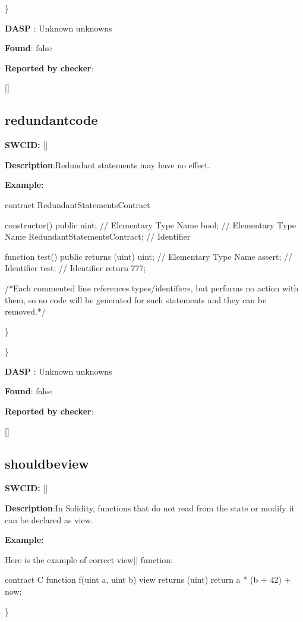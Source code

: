 \documentclass{article}
\begin{document}
\} 

\textbf{DASP} : Unknown unknowns

\textbf{Found}: false

\textbf{Reported by checker}: 
\begin{ffcode} 

[]
\end{ffcode} 
\subsection{redundant{\textunderscore}code} 
\textbf{SWC{\textunderscore}ID:} []

\textbf{Description}:Redundant statements may have no effect.


\textbf{Example:} 
\begin{ffcode} 

contract RedundantStatementsContract {

    constructor() public {
        uint; // Elementary Type Name
        bool; // Elementary Type Name
        RedundantStatementsContract; // Identifier
    }

    function test() public returns (uint) {
        uint; // Elementary Type Name
        assert; // Identifier
        test; // Identifier
        return 777;
    }
}

 /*Each commented line references types/identifiers, but performs no action with them, so no code will be generated for such statements and they can be removed.*/ 

\end{ffcode} 
\} 

\} 

\textbf{DASP} : Unknown unknowns

\textbf{Found}: false

\textbf{Reported by checker}: 
\begin{ffcode} 

[]
\end{ffcode} 
\subsection{should{\textunderscore}be{\textunderscore}view} 
\textbf{SWC{\textunderscore}ID:} []

\textbf{Description}:In Solidity, functions that do not read from the state or modify it can be declared as view.


\textbf{Example:} 
\begin{ffcode} 

Here is the example of correct view|\textendash| function:

contract C {
    function f(uint a, uint b) view returns (uint) {
        return a * (b + 42) + now;
    }
}

\end{ffcode} 
\} 
\end{document}
